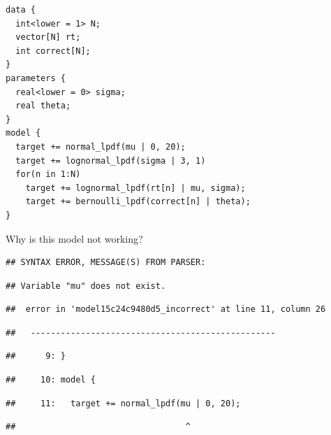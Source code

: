 \documentclass[12pt,]{krantz}
\newenvironment{Shaded}{\begin{snugshade}}{\end{snugshade}}
\newcommand{\KeywordTok}[1]{\textcolor[rgb]{0.13,0.29,0.53}{\textbf{#1}}}
\newcommand{\DataTypeTok}[1]{\textcolor[rgb]{0.13,0.29,0.53}{#1}}
\newcommand{\StringTok}[1]{\textcolor[rgb]{0.31,0.60,0.02}{#1}}
\newcommand{\OperatorTok}[1]{\textcolor[rgb]{0.81,0.36,0.00}{\textbf{#1}}}
\newcommand{\NormalTok}[1]{#1}
\theoremstyle{definition}
\theoremstyle{definition}
\theoremstyle{definition}
\theoremstyle{remark}
\begin{document}
\begin{verbatim}
data {
  int<lower = 1> N;
  vector[N] rt;
  int correct[N];
}
parameters {
  real<lower = 0> sigma;
  real theta;
}
model {
  target += normal_lpdf(mu | 0, 20);
  target += lognormal_lpdf(sigma | 3, 1)
  for(n in 1:N)
    target += lognormal_lpdf(rt[n] | mu, sigma);
    target += bernoulli_lpdf(correct[n] | theta);
}
\end{verbatim}

Why is this model not working?

\begin{Shaded}
\end{Shaded}

\begin{verbatim}
## SYNTAX ERROR, MESSAGE(S) FROM PARSER:
\end{verbatim}

\begin{verbatim}
## Variable "mu" does not exist.
\end{verbatim}

\begin{verbatim}
##  error in 'model15c24c9480d5_incorrect' at line 11, column 26
\end{verbatim}

\begin{verbatim}
##   -------------------------------------------------
\end{verbatim}

\begin{verbatim}
##      9: }
\end{verbatim}

\begin{verbatim}
##     10: model {
\end{verbatim}

\begin{verbatim}
##     11:   target += normal_lpdf(mu | 0, 20);
\end{verbatim}

\begin{verbatim}
##                                  ^
\end{verbatim}
\end{document}
